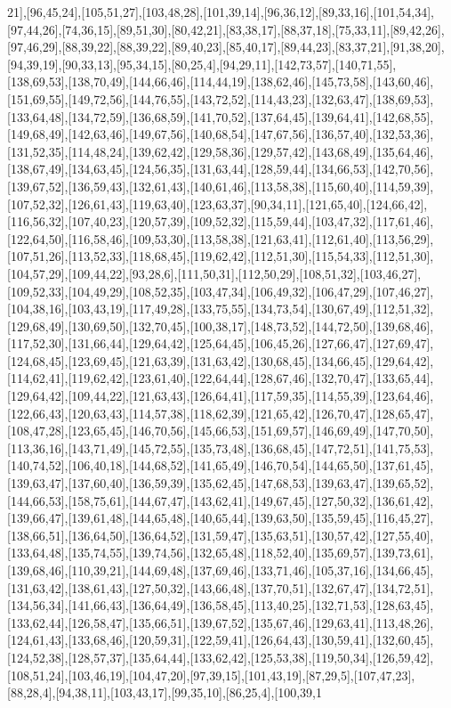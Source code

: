 21],[96,45,24],[105,51,27],[103,48,28],[101,39,14],[96,36,12],[89,33,16],[101,54,34],[97,44,26],[74,36,15],[89,51,30],[80,42,21],[83,38,17],[88,37,18],[75,33,11],[89,42,26],[97,46,29],[88,39,22],[88,39,22],[89,40,23],[85,40,17],[89,44,23],[83,37,21],[91,38,20],[94,39,19],[90,33,13],[95,34,15],[80,25,4],[94,29,11],[142,73,57],[140,71,55],[138,69,53],[138,70,49],[144,66,46],[114,44,19],[138,62,46],[145,73,58],[143,60,46],[151,69,55],[149,72,56],[144,76,55],[143,72,52],[114,43,23],[132,63,47],[138,69,53],[133,64,48],[134,72,59],[136,68,59],[141,70,52],[137,64,45],[139,64,41],[142,68,55],[149,68,49],[142,63,46],[149,67,56],[140,68,54],[147,67,56],[136,57,40],[132,53,36],[131,52,35],[114,48,24],[139,62,42],[129,58,36],[129,57,42],[143,68,49],[135,64,46],[138,67,49],[134,63,45],[124,56,35],[131,63,44],[128,59,44],[134,66,53],[142,70,56],[139,67,52],[136,59,43],[132,61,43],[140,61,46],[113,58,38],[115,60,40],[114,59,39],[107,52,32],[126,61,43],[119,63,40],[123,63,37],[90,34,11],[121,65,40],[124,66,42],[116,56,32],[107,40,23],[120,57,39],[109,52,32],[115,59,44],[103,47,32],[117,61,46],[122,64,50],[116,58,46],[109,53,30],[113,58,38],[121,63,41],[112,61,40],[113,56,29],[107,51,26],[113,52,33],[118,68,45],[119,62,42],[112,51,30],[115,54,33],[112,51,30],[104,57,29],[109,44,22],[93,28,6],[111,50,31],[112,50,29],[108,51,32],[103,46,27],[109,52,33],[104,49,29],[108,52,35],[103,47,34],[106,49,32],[106,47,29],[107,46,27],[104,38,16],[103,43,19],[117,49,28],[133,75,55],[134,73,54],[130,67,49],[112,51,32],[129,68,49],[130,69,50],[132,70,45],[100,38,17],[148,73,52],[144,72,50],[139,68,46],[117,52,30],[131,66,44],[129,64,42],[125,64,45],[106,45,26],[127,66,47],[127,69,47],[124,68,45],[123,69,45],[121,63,39],[131,63,42],[130,68,45],[134,66,45],[129,64,42],[114,62,41],[119,62,42],[123,61,40],[122,64,44],[128,67,46],[132,70,47],[133,65,44],[129,64,42],[109,44,22],[121,63,43],[126,64,41],[117,59,35],[114,55,39],[123,64,46],[122,66,43],[120,63,43],[114,57,38],[118,62,39],[121,65,42],[126,70,47],[128,65,47],[108,47,28],[123,65,45],[146,70,56],[145,66,53],[151,69,57],[146,69,49],[147,70,50],[113,36,16],[143,71,49],[145,72,55],[135,73,48],[136,68,45],[147,72,51],[141,75,53],[140,74,52],[106,40,18],[144,68,52],[141,65,49],[146,70,54],[144,65,50],[137,61,45],[139,63,47],[137,60,40],[136,59,39],[135,62,45],[147,68,53],[139,63,47],[139,65,52],[144,66,53],[158,75,61],[144,67,47],[143,62,41],[149,67,45],[127,50,32],[136,61,42],[139,66,47],[139,61,48],[144,65,48],[140,65,44],[139,63,50],[135,59,45],[116,45,27],[138,66,51],[136,64,50],[136,64,52],[131,59,47],[135,63,51],[130,57,42],[127,55,40],[133,64,48],[135,74,55],[139,74,56],[132,65,48],[118,52,40],[135,69,57],[139,73,61],[139,68,46],[110,39,21],[144,69,48],[137,69,46],[133,71,46],[105,37,16],[134,66,45],[131,63,42],[138,61,43],[127,50,32],[143,66,48],[137,70,51],[132,67,47],[134,72,51],[134,56,34],[141,66,43],[136,64,49],[136,58,45],[113,40,25],[132,71,53],[128,63,45],[133,62,44],[126,58,47],[135,66,51],[139,67,52],[135,67,46],[129,63,41],[113,48,26],[124,61,43],[133,68,46],[120,59,31],[122,59,41],[126,64,43],[130,59,41],[132,60,45],[124,52,38],[128,57,37],[135,64,44],[133,62,42],[125,53,38],[119,50,34],[126,59,42],[108,51,24],[103,46,19],[104,47,20],[97,39,15],[101,43,19],[87,29,5],[107,47,23],[88,28,4],[94,38,11],[103,43,17],[99,35,10],[86,25,4],[100,39,1